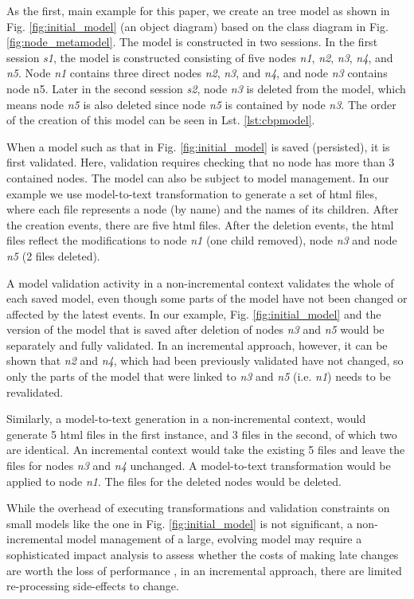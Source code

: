 \documentclass{llncs}
\begin{document}
As the first, main example for this paper, we create an tree model as shown in Fig. \ref{fig:initial_model} (an object diagram) based on the class diagram in Fig. \ref{fig:node_metamodel}. The model is constructed in two sessions. In the first session \emph{s1}, the model is constructed consisting of five nodes \emph{n1}, \emph{n2}, \emph{n3}, \emph{n4}, and \emph{n5}. Node \emph{n1} contains three direct nodes \emph{n2}, \emph{n3}, and \emph{n4}, and node \emph{n3} contains node {n5}. Later in the second session \emph{s2}, node \emph{n3} is deleted from the model, which means node \emph{n5} is also deleted since node \emph{n5} is contained by node \emph{n3}. The order of the creation of this model can be seen in Lst. \ref{lst:cbpmodel}.

When a model such as that in Fig. \ref{fig:initial_model} is saved (persisted), it is first validated. Here, validation requires checking that no node has more than 3 contained nodes. The model can also be subject to model management. In our example we use model-to-text transformation to generate a set of html files, where each file represents a node (by name) and the names of its children. After the creation events, there are five html files. After the deletion events, the html files reflect the modifications to node \emph{n1} (one child removed), node \emph{n3} and node \emph{n5} (2 files deleted).

A model validation activity in a non-incremental context validates the whole of each saved model, even though some parts of the model have not been changed or affected by the latest events.  In our example, Fig. \ref{fig:initial_model} and the version of the model that is saved after deletion of nodes \emph{n3} and \emph{n5} would be separately and fully validated. In an incremental approach, however, it can be shown that \emph{n2} and \emph{n4}, which had been previously validated have not changed, so only the parts of the model that were linked to \emph{n3} and \emph{n5} (i.e. \emph{n1}) needs to be revalidated.

Similarly, a model-to-text generation in a non-incremental context, would generate 5 html files in the first instance, and 3 files in the second, of which two are identical. An incremental context would take the existing 5 files and leave the files for nodes \emph{n3} and \emph{n4} unchanged. A model-to-text transformation would be applied to node \emph{n1}. The files for the deleted nodes would be deleted.

While the overhead of executing transformations and validation constraints on small models like the one in Fig. \ref{fig:initial_model} is not significant, a non-incremental model management of a large, evolving model may require a sophisticated impact analysis to assess whether the costs of making late changes are worth the loss of performance \cite{selic2003pragmatics}, in an incremental approach, there are limited re-processing side-effects to change. 
\end{document}
